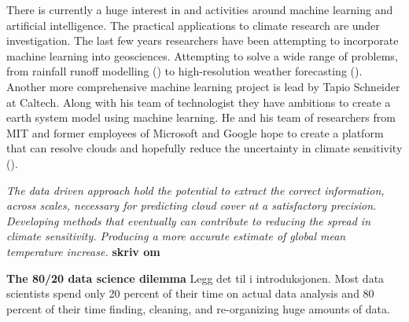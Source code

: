 There is currently a huge interest in and activities around machine learning and artificial intelligence.
The practical applications to climate research are under investigation. The last few years researchers have been attempting to incorporate machine learning into geosciences. Attempting to solve a wide range of problems, from rainfall runoff modelling (\cite{hess-23-5089-2019}) to  high-resolution weather forecasting (\cite{Rodrigues2018DeepDownscale:Forecast}).
Another more comprehensive machine learning project is lead by Tapio Schneider at Caltech. Along with his team of technologist they have ambitions to create a earth system model using machine learning. He and his team of researchers from MIT and former employees of Microsoft and Google hope to create a platform that can resolve clouds and hopefully reduce the uncertainty in climate sensitivity  (\cite{Voosen2018ScienceIntelligence}).

\textit{The data driven approach hold the potential to extract the correct information, across scales, necessary for predicting cloud cover at a satisfactory precision. Developing methods that eventually can contribute to reducing the spread in climate sensitivity. Producing a more accurate estimate of global mean temperature increase.} \textbf{skriv om}

\textbf{The 80/20 data science dilemma} Legg det til i introduksjonen. Most data scientists spend only 20 percent of their time on actual data analysis and 80 percent of their time finding, cleaning, and re-organizing huge amounts of data.


